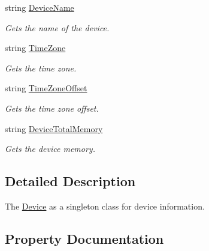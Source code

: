 \begin{DoxyCompactItemize}
string \hyperlink{classClient_1_1Common_1_1Models_1_1Device_a256551335f6465871fa46566a4f6cb13}{Device\+Name}
\begin{DoxyCompactList}\small\item\em Gets the name of the device. \end{DoxyCompactList}\item 
string \hyperlink{classClient_1_1Common_1_1Models_1_1Device_a9809c0bb9a9868fe59b09afdf9b4fa30}{Time\+Zone}
\begin{DoxyCompactList}\small\item\em Gets the time zone. \end{DoxyCompactList}\item 
string \hyperlink{classClient_1_1Common_1_1Models_1_1Device_a3a837640c537f14a5a94b50fc9ccb535}{Time\+Zone\+Offset}
\begin{DoxyCompactList}\small\item\em Gets the time zone offset. \end{DoxyCompactList}\item 
string \hyperlink{classClient_1_1Common_1_1Models_1_1Device_a45a4827c220415e029d0b8e1c87bb1a0}{Device\+Total\+Memory}
\begin{DoxyCompactList}\small\item\em Gets the device memory. \end{DoxyCompactList}\end{DoxyCompactItemize}


\subsection{Detailed Description}
The \hyperlink{classClient_1_1Common_1_1Models_1_1Device}{Device} as a singleton class for device information. 



\subsection{Property Documentation}
\hypertarget{classClient_1_1Common_1_1Models_1_1Device_a850d4b4655dfaa9ce9467ba84a9d01c7}{}
